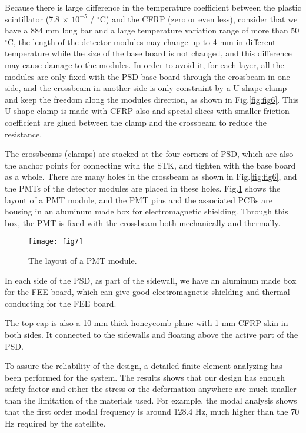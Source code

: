 \documentclass[preprint]{elsarticle}
\begin{document}
Because there is large difference in the temperature coefficient between the plastic scintillator (7.8 $\times$ $10^{-5}$ / $^{\circ}$C) and the CFRP (zero or even less), consider that we have a 884 mm long bar and a large temperature variation range of more than 50 $^{\circ}$C, the length of the detector modules may change up to 4 mm in different temperature while the size of the base board is not changed, and this difference may cause damage to the modules. In order to avoid it, for each layer, all the modules are only fixed with the PSD base board through the crossbeam in one side, and the crossbeam in another side is only constraint by a U-shape clamp and keep the freedom along the modules direction, as shown in Fig.\ref{fig:fig6}. This U-shape clamp is made with CFRP also and special slices with smaller friction coefficient are glued between the clamp and the crossbeam to reduce the resistance.

The crossbeams (clamps) are stacked at the four corners of PSD, which are also the anchor points for connecting with the STK, and tighten with the base board as a whole. There are many holes in the crossbeam as shown in Fig.\ref{fig:fig6}, and the PMTs of the detector modules are placed in these holes. Fig.\ref{fig:fig7} shows the layout of a PMT module, and the PMT pins and the associated PCBs are housing in an aluminum made box for electromagnetic shielding. Through this box, the PMT is fixed with the crossbeam both mechanically and thermally.

\begin{figure}
 \centering
 \texttt{[image: fig7]}
\caption{The layout of a PMT module.}
\label{fig:fig7}
\end{figure}

In each side of the PSD, as part of the sidewall, we have an aluminum made box for the FEE board, which can give good electromagnetic shielding and thermal conducting for the FEE board.

The top cap is also a 10 mm thick honeycomb plane with 1 mm CFRP skin in both sides. It connected to the sidewalls and floating above the active part of the PSD.

To assure the reliability of the design, a detailed finite element analyzing has been performed for the system. The results shows that our design has enough safety factor and either the stress or the deformation anywhere are much smaller than the limitation of the materials used. For example, the modal analysis shows that the first order modal frequency is around 128.4 Hz, much higher than the 70 Hz required by the satellite.
\end{document}
